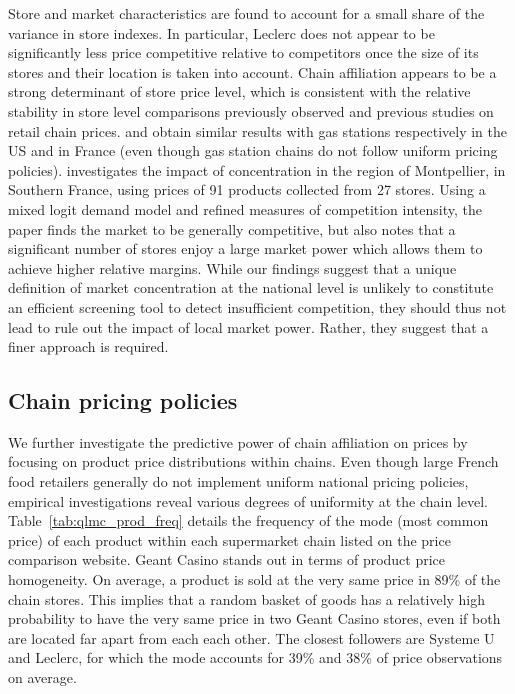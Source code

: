 \documentclass[english]{article}
\begin{document}
Store and market characteristics are found to account for a small share of the variance in store indexes. In particular, Leclerc does not appear to be significantly less price competitive relative to competitors once the size of its stores and their location is taken into account. Chain affiliation appears to be a strong determinant of store price level, which is consistent with the relative stability in store level comparisons previously observed and previous studies on retail chain prices. \cite{HOS08} and \cite{CHA16} obtain similar results with gas stations respectively in the US and in France (even though gas station chains do not follow uniform pricing policies). \cite{TUR16} investigates the impact of concentration in the region of Montpellier, in Southern France, using prices of 91 products collected from 27 stores. Using a mixed logit demand model and refined measures of competition intensity, the paper finds the market to be generally competitive, but also notes that a significant number of stores enjoy a large market power which allows them to achieve higher relative margins. While our findings suggest that a unique definition of market concentration at the national level is unlikely to constitute an efficient screening tool to detect insufficient competition, they should thus not lead to rule out the impact of local market power. Rather, they suggest that a finer approach is required.

\subsection{Chain pricing policies}

We further investigate the predictive power of chain affiliation on prices by focusing on product price distributions within chains. Even though large French food retailers generally do not implement uniform national pricing policies, empirical investigations reveal various degrees of uniformity at the chain level. Table~\ref{tab:qlmc_prod_freq} details the frequency of the mode (most common price) of each product within each supermarket chain listed on the price comparison website. Geant Casino stands out in terms of product price homogeneity. On average, a product is sold at the very same price in 89\% of the chain stores. This implies that a random basket of goods has a relatively high probability to have the very same price in two Geant Casino stores, even if both are located far apart from each each other. The closest followers are Systeme U and Leclerc, for which the mode accounts for 39\% and 38\% of price observations on average.
\end{document}
